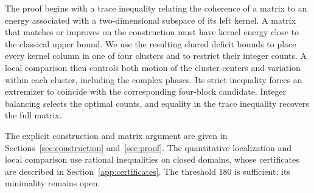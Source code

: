 The proof begins with a trace inequality relating the coherence of a
matrix to an energy associated with a two-dimensional subspace of its
left kernel. A matrix that matches or improves on the construction must
have kernel energy close to the classical upper bound. We use the
resulting shared deficit bounds to place every kernel
column in one of four clusters and to restrict their integer counts.
A local comparison then controls both motion of the cluster centers and
variation within each cluster, including the complex phases. Its strict
inequality forces an extremizer to coincide with the corresponding
four-block candidate. Integer balancing selects the optimal counts,
and equality in the trace inequality recovers the full matrix.

The explicit construction and matrix argument are given in
Sections~\ref{sec:construction} and~\ref{sec:proof}. The quantitative
localization and local comparison use rational inequalities on closed
domains, whose certificates are described in Section~\ref{app:certificates}.
The threshold $180$ is sufficient; its minimality remains open.
